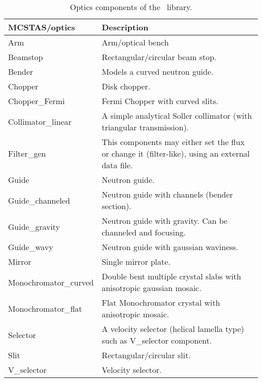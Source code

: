 \begin{table}
  \begin{center}
    {\let\my=\\
    \begin{tabular}{|p{}|p{}|}
      \hline
       MCSTAS/optics & Description \\
       \hline
Arm                &  Arm/optical bench \\
 Beamstop          &   Rectangular/circular
                      beam stop. \\
 Bender            &   Models a curved
                      neutron guide. \\
 Chopper           &   Disk chopper. \\
 Chopper\_Fermi     &   Fermi Chopper with
                      curved slits. \\
 Collimator\_linear &  A simple analytical Soller collimator
                      (with triangular
                      transmission).  \\
 Filter\_gen        &   This components may
                      either set the flux
                      or change it (filter-like), using
                      an external data
                      file. \\
 Guide             &   Neutron guide. \\
 Guide\_channeled   &   Neutron guide with
                      channels (bender
                      section). \\
 Guide\_gravity     &  Neutron guide with gravity. Can be
                      channeled and focusing. \\

 Guide\_wavy        &   Neutron guide with
                      gaussian waviness. \\

 Mirror             &  Single mirror plate. \\

                      
 Monochromator\_curved & Double bent multiple crystal
                      slabs with anisotropic gaussian
                      mosaic. \\

 Monochromator\_flat &  Flat Monochromator
                      crystal with
                      anisotropic mosaic. \\

 Selector            & A velocity selector
                      (helical lamella
                      type) such as
                      V\_selector component. \\

 Slit                & Rectangular/circular
                      slit. \\

 V\_selector          & Velocity selector. \\
      \hline
    \end{tabular}
    \caption{Optics components of the \MCS\ library.}
    \label{t:comp-optics}
    }
  \end{center}
\end{table}

